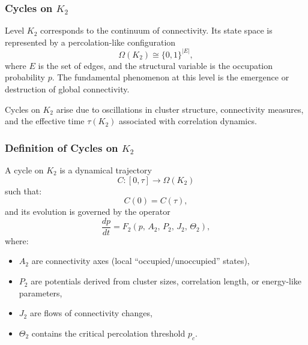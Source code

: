 
\subsubsection{Cycles on \texorpdfstring{$K_2$}{K_2}}
\label{sec:cycles-k2}

Level $K_2$ corresponds to the continuum of connectivity.
Its state space is represented by a percolation-like configuration
\[
  \Omega(K_2) \cong \{0,1\}^{|E|},
\]
where $E$ is the set of edges, and the structural variable is the
occupation probability $p$.
The fundamental phenomenon at this level is the emergence or destruction
of global connectivity.

Cycles on $K_2$ arise due to oscillations in cluster structure,
connectivity measures, and the effective time $\tau(K_2)$ associated
with correlation dynamics.

\subsubsection{Definition of Cycles on \texorpdfstring{$K_2$}{K_2}}

A cycle on $K_2$ is a dynamical trajectory
\[
  C:[0,\tau]\to\Omega(K_2)
\]
such that:
\[
  C(0)=C(\tau),
\]
and its evolution is governed by the operator
\[
  \frac{dp}{dt}
  = F_2(p,\, A_2,\, P_2,\, J_2,\, \Theta_2),
\]
where:

\begin{itemize}
  \item $A_2$ are connectivity axes (local ``occupied/unoccupied'' states),
  \item $P_2$ are potentials derived from cluster sizes, correlation length,
        or energy-like parameters,
  \item $J_2$ are flows of connectivity changes,
  \item $\Theta_2$ contains the critical percolation threshold $p_c$.
\end{itemize}

